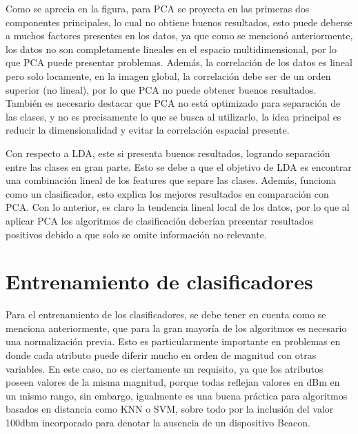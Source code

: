 Como se aprecia en la figura, para PCA se proyecta en las primeras dos componentes principales, lo cual no obtiene buenos resultados, esto puede deberse a muchos factores presentes en los datos, ya que como se mencionó anteriormente, los datos no son completamente lineales en el espacio multidimensional, por lo que PCA puede presentar problemas. Además, la correlación de los datos es lineal pero solo locamente, en la imagen global, la correlación debe ser de un orden superior (no lineal), por lo que PCA no puede obtener buenos resultados. También es necesario destacar que PCA no está optimizado para separación de las clases, y no es precisamente lo que se busca al utilizarlo, la idea principal es reducir la dimensionalidad y evitar la correlación espacial presente. 

Con respecto a LDA, este si presenta buenos resultados, logrando separación entre las clases en gran parte. Esto se debe a que el objetivo de LDA es encontrar una combinación lineal de los features que separe las clases. Además, funciona como un clasificador, esto explica los mejores resultados en comparación con PCA. Con lo anterior, es claro la tendencia lineal local de los datos, por lo que al aplicar PCA los algoritmos de clasificación deberían presentar resultados positivos debido a que solo se omite información no relevante.

\section{Entrenamiento de clasificadores}

Para el entrenamiento de los clasificadores, se debe tener en cuenta como se menciona anteriormente, que para la gran mayoría de los algoritmos es necesario una normalización previa. Esto es particularmente importante en problemas en donde cada atributo puede diferir mucho en orden de magnitud con otras variables. En este caso, no es ciertamente un requisito, ya que los atributos poseen valores de la misma magnitud, porque todas reflejan valores en dBm en un mismo rango, sin embargo, igualmente es una buena práctica para algoritmos basados en distancia como KNN o SVM, sobre todo por la inclusión del valor 100dbm incorporado para denotar la ausencia de un dispositivo Beacon.


